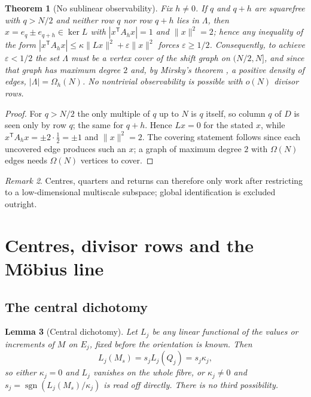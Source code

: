 \documentclass[11pt]{amsart}
\numberwithin{equation}{section}
\theoremstyle{plain}
\newtheorem{theorem}{Theorem}[section]
\newtheorem{lemma}[theorem]{Lemma}
\theoremstyle{definition}
\theoremstyle{remark}
\newtheorem{remark}[theorem]{Remark}
\begin{document}
\begin{theorem}[No sublinear observability]
\label{thm:sublinear_nogo}
Fix $h\ne0$. If $q$ and $q+h$ are squarefree with $q>N/2$ and neither
row $q$ nor row $q+h$ lies in $\Lambda$, then
$x=e_q\pm e_{q+h}\in\ker L$ with $|x^{\mathsf T}A_hx|=1$ and
$\|x\|^2=2$; hence any inequality of the form
$|x^{\mathsf T}A_hx|\le\kappa\|Lx\|^2+\varepsilon\|x\|^2$ forces
$\varepsilon\ge1/2$. Consequently, to achieve $\varepsilon<1/2$ the set
$\Lambda$ must be a vertex cover of the shift graph on $(N/2,N]$, and
since that graph has maximum degree $2$ and, by Mirsky's theorem
\cite{Mirsky1949}, a positive density of edges, $|\Lambda|=\Omega_h(N)$.
No nontrivial observability is possible with $o(N)$ divisor rows.
\end{theorem}

\begin{proof}
For $q>N/2$ the only multiple of $q$ up to $N$ is $q$ itself, so column
$q$ of $D$ is seen only by row $q$; the same for $q+h$. Hence
$Lx=0$ for the stated $x$, while
$x^{\mathsf T}A_hx=\pm2\cdot\tfrac12=\pm1$ and $\|x\|^2=2$. The
covering statement follows since each uncovered edge produces such an
$x$; a graph of maximum degree $2$ with $\Omega(N)$ edges needs
$\Omega(N)$ vertices to cover.
\end{proof}

\begin{remark}
\label{rem:nogo_consequence}
Centres, quarters and returns can therefore only work after restricting
to a low-dimensional multiscale subspace; global identification is
excluded outright.
\end{remark}

\section{Centres, divisor rows and the M\"obius line}
\label{sec:centers}

\subsection{The central dichotomy}
\label{subsec:central_dichotomy}

\begin{lemma}[Central dichotomy]
\label{lem:central_dichotomy}
Let $L_j$ be any linear functional of the values or increments of $M$ on
$E_j$, fixed before the orientation is known. Then
\begin{equation}
L_j(M_s)=s_jL_j(Q_j)=s_j\kappa_j ,
\label{eq:central_dichotomy}
\end{equation}
so either $\kappa_j=0$ and $L_j$ vanishes on the whole fibre, or
$\kappa_j\ne0$ and $s_j=\operatorname{sgn}(L_j(M_s)/\kappa_j)$ is read
off directly. There is no third possibility.
\end{lemma}
\end{document}
